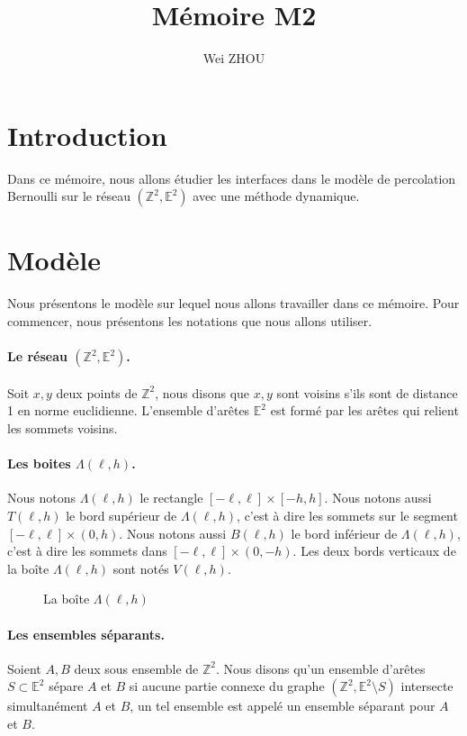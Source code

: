 \documentclass[titlepage,a4paper,12pt]{article}
\title{Mémoire M2}
\author{Wei ZHOU}
\begin{document}
\maketitle

\section{Introduction}
 Dans ce mémoire, nous allons étudier les interfaces dans le modèle de percolation Bernoulli sur le réseau $(\mathbb{Z}^2,\mathbb{E}^2)$ avec une méthode dynamique.

\section{Modèle}
Nous présentons le modèle sur lequel nous allons travailler dans ce mémoire. Pour commencer, nous présentons les notations que nous allons utiliser.

\paragraph{Le réseau $(\mathbb{Z}^2,\mathbb{E}^2)$.} Soit $x,y$ deux points de $\mathbb{Z}^2$, nous disons que $x,y$ sont voisins s'ils sont de distance 1 en norme euclidienne. L'ensemble d'arêtes $\mathbb{E}^2$ est formé par les arêtes qui relient les sommets voisins.

\paragraph{Les boites $\Lambda(\ell,h)$.} Nous notons $\Lambda(\ell,h)$ le rectangle $[-\ell,\ell]\times[-h,h]$. Nous notons aussi $T(\ell,h)$ le bord supérieur de $\Lambda(\ell,h)$, c'est à dire les sommets sur le segment $[-\ell,\ell]\times(0,h)$. Nous notons aussi $B(\ell,h)$ le bord inférieur de $\Lambda(\ell,h)$, c'est à dire les sommets dans $[-\ell,\ell]\times(0,-h)$. Les deux bords verticaux de la boîte $\Lambda(\ell,h)$ sont notés $V(\ell,h)$.
\begin{figure}[h]
\center
{}
\caption{La boîte $\Lambda(\ell,h)$}
\end{figure}

\paragraph{Les ensembles séparants.} Soient $A,B$ deux sous ensemble de $\mathbb{Z}^2$. Nous disons qu'un ensemble d'arêtes $S\subset \mathbb{E}^2$ sépare $A$ et $B$ si aucune partie connexe du graphe $(\mathbb{Z}^2,\mathbb{E}^2 \setminus S)$ intersecte simultanément $A$ et $B$, un tel ensemble est appelé un ensemble séparant pour $A$ et $B$.
\end{document}
